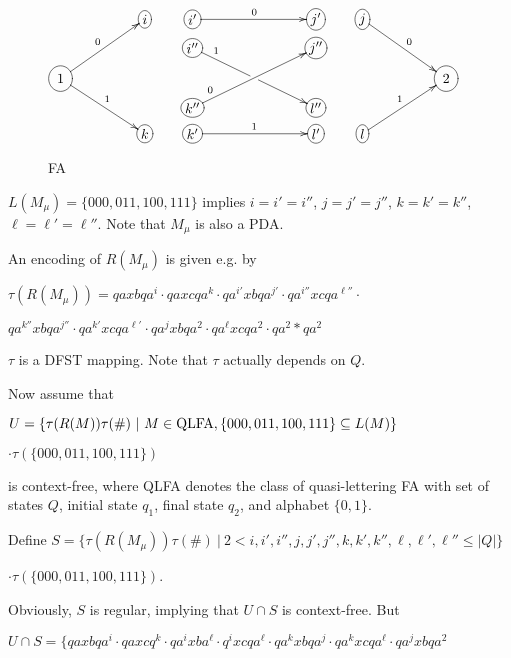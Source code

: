 \documentclass{eptcs}
\begin{document}
	\begin{figure}[htbp]
		\centerline{
		$\xymatrix@R=5pt@C=20pt{
			&& *+[o][F]{i} 
			& *+[o][F]{i'} 
				\ar[rrr]^{0}
			&&& *+[o][F]{j'} 
			& *+[o][F]{j}
				\ar[ddrr]^{0}\\
			&&& *+[o][F]{i''} 
				\ar[ddrrr]^<<<<{1}|{\hole}
			&&& *+[o][F]{j''} \\
			*++[o][F]{1} 
				\ar[uurr]^{0}
				\ar[ddrr]^{1}
			&&&&&&&&&*++[o][F]{2} \\
			&&& *+[o][F]{k''} 
				\ar[uurrr]^<<<<{0}
			&&& *+[o][F]{l''} \\
			&& *+[o][F]{k} 
			& *+[o][F]{k'} 
				\ar[rrr]^{1}
			&&& *+[o][F]{l'} 
			& *+[o][F]{l}
				\ar[uurr]^{1}\\
		}$
		}
		\caption{FA}
		\label{fig:upda2}
	\end{figure}


$L(M_{\mu})=\{000,011,100,111\}$ implies $i=i'=i''$, $j=j'=j''$, $k=k'=k''$,
$\ell=\ell'=\ell''$.
Note that $M_{\mu}$ is also a PDA.

An encoding of $R(M_{\mu})$ is given e.g. by

$\tau(R(M_{\mu}))=qaxbqa^i\cdot qaxcqa^k\cdot qa^{i'}xbqa^{j'}\cdot qa^{i''}xcqa^{\ell''}\cdot
$

\hspace{1.5cm}$qa^{k''}xbqa^{j''}\cdot qa^{k'}xcqa^{\ell'}\cdot qa^jxbqa^2\cdot qa^{\ell}xcqa^2\cdot
 qa^2*qa^2$



$\tau$ is a DFST mapping.
Note that $\tau$ actually depends on $Q$.

\medskip

Now assume that

$U=\{\tau(R(M))\tau({\#})\ |\ M\in {\rm QLFA}, \{000,011,100,111\}\subseteq L(M)\}$

\hspace{.8cm}$\cdot\tau(\{000,011,100,111\})$

is context-free, where QLFA denotes the class of quasi-lettering FA with
set of states $Q$, initial state $q_1$, final state $q_2$, and alphabet $\{0,1\}$.

Define
$S=\{\tau(R(M_{\mu}))\tau({\#})\ |\ 2<i,i',i'',j,j',j'',k,k',k'',\ell,\ell',\ell''\leq |Q|\}$

\hspace{2cm}$\cdot\tau(\{000,011,100,111\})$.


Obviously, $S$ is regular, implying that $U\cap S$ is context-free. But

$U\cap S = \{qaxbqa^i\cdot qaxcq^k\cdot qa^ixba^{\ell}\cdot q^ixcqa^{\ell}\cdot
qa^kxbqa^j\cdot qa^kxcqa^{\ell}\cdot qa^jxbqa^2$
\end{document}
